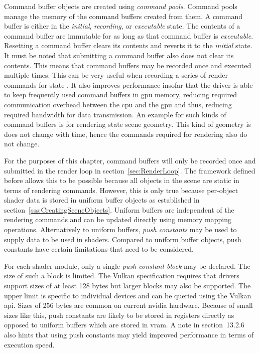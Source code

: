     Command buffer objects are created using \textit{command pools}.
    Command pools manage the memory of the command buffers created from them.
    A command buffer is either in the \textit{initial}, \textit{recording}, or \textit{executable} state.
    The contents of a command buffer are immutable for as long as that command buffer is \textit{executable}.
    Resetting a command buffer clears its contents and reverts it to the \textit{initial} state.
    It must be noted that submitting a command buffer also does not clear its contents.
    This means that command buffers may be recorded once and executed multiple times.
    This can be very useful when recording a series of render commands for state .
    It also improves performance insofar that the \gls{driver} is able to keep frequently used command buffers in \gls{gpu} memory, reducing required communication overhead between the \gls{cpu} and the \gls{gpu} and thus, reducing required bandwidth for data transmission.
    An example for such kinds of command buffers is for rendering state scene geometry.
    This kind of geometry is does not change with time, hence the commands required for rendering also do not change.

    For the purposes of this chapter, command buffers will only be recorded once and submitted in the render loop in section~\ref{sec:RenderLoop}.
    The framework defined before allows this to be possible because all objects in the scene are static in terms of rendering commands.
    However, this is only true because per-object shader data is stored in uniform buffer objects as established in section~\ref{sss:CreatingSceneObjects}.
    Uniform buffers are independent of the rendering commands and can be updated directly using memory mapping operations.
    Alternatively to uniform buffers, \textit{push constants} may be used to supply data to be used in shaders.
    Compared to uniform buffer objects, push constants have certain limitations that need to be considered.

    For each shader module, only a single \textit{push constant block} may be declared.
    The size of such a block is limited.
    The Vulkan specification requires that \glspl{driver} support sizes of at least 128 bytes but larger blocks may also be supported.
    The upper limit is specific to individual devices and can be queried using the Vulkan \gls{api}.
    Sizes of 256 bytes are common on current \gls{nvidia} hardware.
    Because of small sizes like this, push constants are likely to be stored in registers directly as opposed to uniform buffers which are stored in \gls{vram}.
    A note in section~13.2.6 also hints that using push constants may yield improved performance in terms of execution speed.

